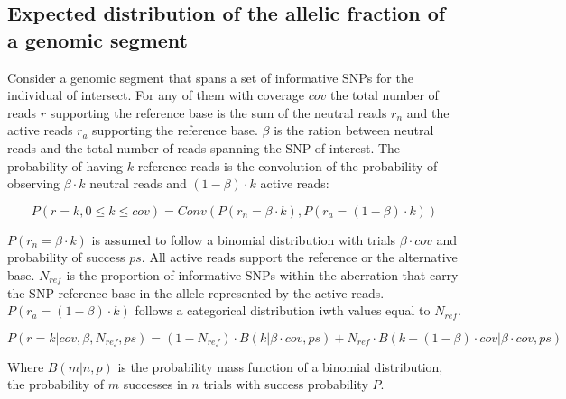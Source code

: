 	\subsection{Expected distribution of the allelic fraction of a genomic segment}
	Consider a genomic segment that spans a set of informative SNPs for the individual of intersect.
	For any of them with coverage $cov$ the total number of reads $r$ supporting the reference base is the sum of the neutral reads $r_n$ and the active reads $r_a$ supporting the reference base.
	$\beta$ is the ration between neutral reads and the total number of reads spanning the SNP of interest.
	The probability of having $k$ reference reads is the convolution of the probability of observing $\beta\cdot k$ neutral reads and $(1-\beta)\cdot k$ active reads:

	$$P(r = k, 0\le k\le cov) = Conv(P(r_n = \beta\cdot k), P(r_a = (1-\beta)\cdot k))$$

	$P(r_n = \beta\cdot k)$ is assumed to follow a binomial distribution with trials $\beta\cdot cov$ and probability of success $ps$.
	All active reads support the reference or the alternative base.
	$N_{ref}$ is the proportion of informative SNPs within the aberration that carry the SNP reference base in the allele represented by the active reads.
	$P(r_a = (1-\beta)\cdot k)$ follows a categorical distribution iwth values equal to $N_{ref}$.

	$$P(r = k|cov, \beta, N_{ref}, ps) = (1-N_{ref})\cdot B(k|\beta\cdot cov, ps) + N_{ref}\cdot B(k-(1-\beta)\cdot cov | \beta\cdot cov, ps)$$

	Where $B(m|n, p)$ is the probability mass function of a binomial distribution, the probability of $m$ successes in $n$ trials with success probability $P$.
